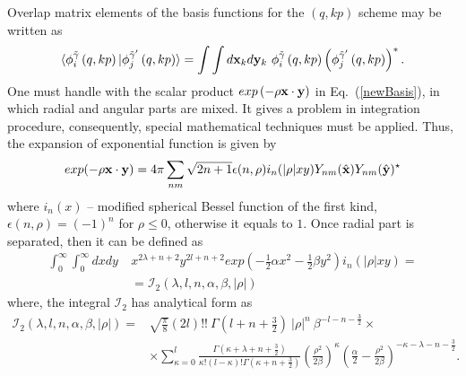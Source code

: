 \documentclass[
12pt, %
oneside, %
english, %
onehalfspacing, %
onehalfspacing, %
headsepline, %
]{MastersDoctoralThesis} %
\begin{document}
Overlap matrix elements of the basis functions for the $\left(q, kp \right)$ scheme may be written as
\begin{equation}
\langle \phi_{i}^{\tilde{\gamma}}\left(q,kp \right) \vert 
\phi_{j}^{\tilde{\gamma}^{\prime}}\left(q,kp \right) \rangle =
\int \int d{\bf x}_k d{\bf y}_k ~\phi_{i}^{\tilde{\gamma}}\left(q,kp \right) \left( \phi_{j}^{\tilde{\gamma}^{\prime}}\left(q,kp \right) \right)^{*}.
\label{me_arb}
\end{equation}
One must handle with the scalar product $exp\left(- \rho {\bf x} \cdot {\bf y} \right)$ in  Eq.~(\ref{newBasis}), in which radial and angular parts are mixed. It gives a problem in integration procedure, consequently, special mathematical techniques must be applied. 
Thus, the expansion of exponential function is given by 
\begin{equation}
exp(-\rho {\bf x} \cdot {\bf y}) = 4 \pi \sum_{n m} \sqrt{2n+1} 
\epsilon(n, \rho)i_{n}(|\rho|xy)Y_{n m}(\hat{{\bf x}}) Y_{n m}(\hat{{\bf y}})^{\star}
\label{exponent_expantion}
\end{equation} 
where $i_{n}(x) $ -- modified spherical Bessel function of the first kind, $\epsilon(n, \rho)=(-1)^{n}$ for $\rho \le 0$, otherwise it equals to $1$.
Once radial part is separated, then it can be defined as
\begin{align}
 \int_0^\infty \int_0^\infty  dx dy~& x^{2\lambda+n+2}y^{2 l +n+2} exp\left( -\tfrac{1}{2}\alpha x^2 - \tfrac{1}{2}\beta y^2 \right) i_{n}(|\rho|xy) \nonumber = \\
& = \mathcal{I}_2(\lambda, l, n, \alpha, \beta, |\rho|) 
\end{align}
where, the integral $\mathcal{I}_2$ has analytical form as
\begin{align}
\mathcal{I}_2(\lambda, l, n, \alpha, \beta, |\rho|) =& \sqrt{\frac{\pi}{8}}(2l)!!~ \Gamma(l+n+\tfrac{3}{2})~|\rho|^{n} ~\beta^{-l-n-\tfrac{3}{2}} \times \nonumber \\
& \times \sum_{\kappa=0}^{l} \frac{\Gamma(\kappa+\lambda+n+\tfrac{3}{2})}{\kappa! (l-\kappa)! \Gamma(\kappa+n+\tfrac{3}{2})}
\left(\frac{\rho^2}{2\beta}\right)^{\kappa} \left( \frac{\alpha}{2} - \frac{\rho^2}{2\beta}  \right)^{-\kappa-\lambda-n-\tfrac{3}{2}}.
\label{overlap1}
\end{align}
\end{document}
